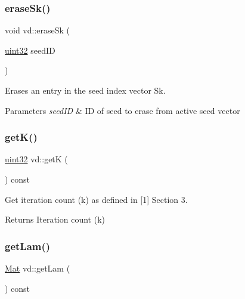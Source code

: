 \subsubsection{\texorpdfstring{erase\+Sk()}{eraseSk()}}
{\footnotesize\ttfamily void vd\+::erase\+Sk (\begin{DoxyParamCaption}\item[{\mbox{\hyperlink{typedefs_8h_a8ad23e2333787a214e20a58a284a5a60}{uint32}}}]{seed\+ID }\end{DoxyParamCaption})}



Erases an entry in the seed index vector Sk. 


\begin{DoxyParams}{Parameters}
{\em seed\+ID} & ID of seed to erase from active seed vector \\
\hline
\end{DoxyParams}
\mbox{\label{classvd_ae145808dbbebfc984811eb48a6a57585}} 
\subsubsection{\texorpdfstring{get\+K()}{getK()}}
{\footnotesize\ttfamily \mbox{\hyperlink{typedefs_8h_a8ad23e2333787a214e20a58a284a5a60}{uint32}} vd\+::getK (\begin{DoxyParamCaption}{ }\end{DoxyParamCaption}) const}



Get iteration count (k) as defined in \mbox{[}1\mbox{]} Section 3. 

\begin{DoxyReturn}{Returns}
Iteration count (k) 
\end{DoxyReturn}
\mbox{\label{classvd_a37c4ab12669eb276fe7fa4a610310345}} 
\subsubsection{\texorpdfstring{get\+Lam()}{getLam()}}
{\footnotesize\ttfamily \mbox{\hyperlink{typedefs_8h_a9fa28c1f74e909474857584f5c7b0088}{Mat}} vd\+::get\+Lam (\begin{DoxyParamCaption}{ }\end{DoxyParamCaption}) const}



